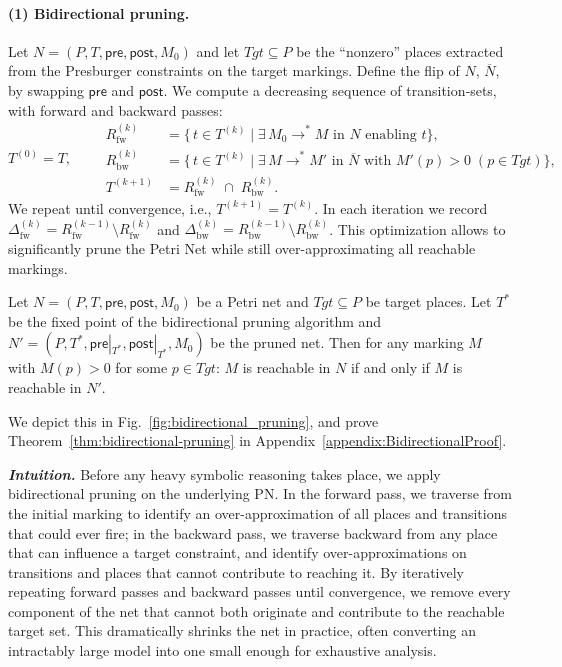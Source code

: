 \paragraph{(1) Bidirectional pruning.}  
Let \(N=(P,T,\mathsf{pre},\mathsf{post},M_0)\) and let \(\mathit{Tgt}\subseteq P\) be the ``nonzero” places extracted from the Presburger constraints on the target markings.  Define the flip of \(N\), \(\overline N\), by swapping \(\mathsf{pre}\) and \(\mathsf{post}\).  We compute a decreasing sequence of transition‐sets, with forward and backward passes:
\[
T^{(0)} = T,\qquad
\begin{aligned}
	R_{\mathrm{fw}}^{(k)} &= \{\,t\in T^{(k)} \mid \exists\,M_0\xrightarrow{}^{*}M\text{ in }N\text{ enabling }t\},\\
	R_{\mathrm{bw}}^{(k)} &= \{\,t\in T^{(k)} \mid \exists\,M\xrightarrow{}^{*}M'\text{ in }\overline N\text{ with }M'(p)>0\;(p\in\mathit{Tgt})\},\\
	T^{(k+1)} &= R_{\mathrm{fw}}^{(k)} \;\cap\; R_{\mathrm{bw}}^{(k)}.
\end{aligned}
\]
We repeat until convergence, i.e.,  \(T^{(k+1)}=T^{(k)}\).  In each iteration we record
\(\Delta_{\mathrm{fw}}^{(k)}=R_{\mathrm{fw}}^{(k-1)}\setminus R_{\mathrm{fw}}^{(k)}\)
and
\(\Delta_{\mathrm{bw}}^{(k)}=R_{\mathrm{bw}}^{(k-1)}\setminus R_{\mathrm{bw}}^{(k)}\).
%
This optimization allows to significantly prune the Petri Net while still over-approximating all reachable markings.

\begin{theorem}
\label{thm:bidirectional-pruning}
Let $N = (P, T, \mathsf{pre}, \mathsf{post}, M_0)$ be a Petri net and $\mathit{Tgt} \subseteq P$ be target places. 
Let $T^*$ be the fixed point of the bidirectional pruning algorithm and $N' = (P, T^*, \mathsf{pre}|_{T^*}, \mathsf{post}|_{T^*}, M_0)$ be the pruned net.
Then for any marking $M$ with $M(p) > 0$ for some $p \in \mathit{Tgt}$:
$M$ is reachable in $N$ if and only if $M$ is reachable in $N'$.
\end{theorem}
%
We depict this in Fig.~\ref{fig:bidirectional_pruning}, and prove Theorem~\ref{thm:bidirectional-pruning} in Appendix~\ref{appendix:BidirectionalProof}.
%

\medskip
\noindent\textit{\textbf{Intuition.}}
Before any heavy symbolic reasoning takes place, we apply bidirectional pruning on the underlying PN.  In the forward pass, we traverse from the initial marking to identify an over-approximation of all places and transitions that could ever fire; in the backward pass, we traverse backward from any place that can influence a target constraint, and identify over-approximations on transitions and places that cannot contribute to reaching it.  By iteratively repeating forward passes and backward passes until convergence, we remove every component of the net that cannot both originate and contribute to the reachable target set.  This dramatically shrinks the net in practice, often converting an intractably large model into one small enough for exhaustive analysis.


